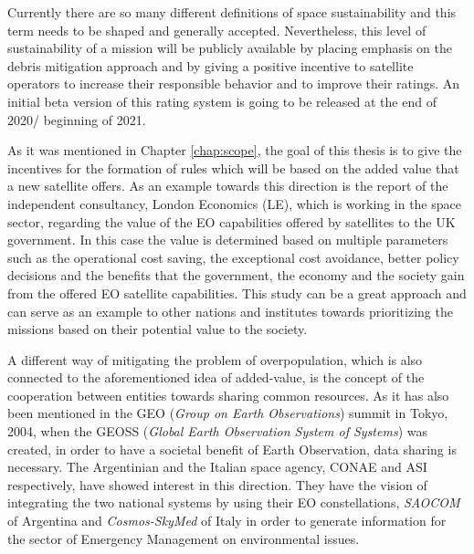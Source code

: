 Currently there are so many different definitions of space sustainability and this term needs to be shaped and generally accepted. Nevertheless, this level of sustainability of a mission will be publicly available by placing emphasis on the debris mitigation approach and by giving a positive incentive to satellite operators to increase their responsible behavior and to improve their ratings. An initial beta version of this rating system is going to be released at the end of 2020/ beginning of 2021.



\bigskip
As it was mentioned in Chapter \ref{chap:scope}, the goal of this thesis is to give the incentives for the formation of rules which will be based on the added value that a new satellite offers. As an example towards this direction is the report of the independent consultancy, London Economics (LE), which is working in the space sector, regarding the value of the EO capabilities offered by satellites to the UK government. \cite{Value UK} In this case the value is determined based on multiple parameters such as the operational cost saving, the exceptional cost avoidance, better policy decisions and the benefits that the government, the economy and the society gain from the offered EO satellite capabilities. This study can be a great approach and can serve as an example to other nations and institutes towards prioritizing the missions based on their potential value to the society.

A different way of mitigating the problem of overpopulation, which is also connected to the aforementioned idea of added-value, is the concept of the cooperation between entities towards sharing common resources. As it has also been mentioned in the GEO (\textit{Group on Earth Observations}) summit in Tokyo, 2004, when the GEOSS (\textit{Global Earth Observation System of Systems}) was created, in order to have a societal benefit of Earth Observation, data sharing is necessary. \cite{Kramer 2002} %
The Argentinian and the Italian space agency, CONAE and ASI respectively, have showed interest in this direction. They have the vision of integrating the two national systems by using their EO constellations, \textit{SAOCOM} of Argentina and \textit{Cosmos-SkyMed} of Italy in order to generate information for the sector of Emergency Management on environmental issues. \cite{Cosmos}  %

